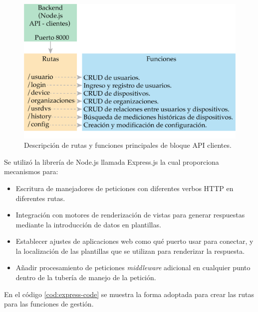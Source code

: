 \begin{figure}[htpb]
	\centering
	\includegraphics[scale=.75]{./Figures/bloque-api-clientes.png}
	\caption[Descripción bloque API clientes]{Descripción de rutas y funciones principales de bloque API clientes.}
	\label{fig:bloque-api-clientes}
\end{figure}

Se utilizó la librería de Node.js llamada Express.js \citep{WEBSITE:36} la cual proporciona mecanismos para:

\begin{itemize}
	\item Escritura de manejadores de peticiones con diferentes verbos HTTP en diferentes rutas.
	
	\item Integración con motores de renderización de vistas para generar respuestas mediante la introducción de datos en plantillas.
	
	\item Establecer ajustes de aplicaciones web como qué puerto usar para conectar, y la localización de las plantillas que se utilizan para renderizar la respuesta.

	\item Añadir procesamiento de peticiones \textit{middleware} adicional en cualquier punto dentro de la tubería de manejo de la petición.

\end{itemize}

En el código \ref{cod:express-code} se muestra la forma adoptada para crear las rutas para las funciones de gestión.

